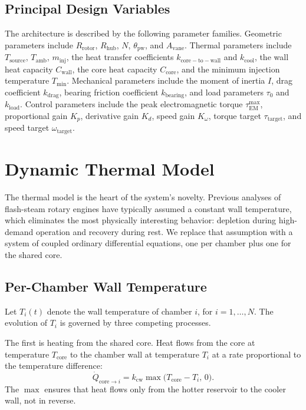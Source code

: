 \documentclass[11pt, a4paper]{article}
\theoremstyle{plain}
\theoremstyle{definition}
\newcommand{\Tcore}{T_{\mathrm{core}}}
\newcommand{\Tsource}{T_{\mathrm{source}}}
\newcommand{\Tambient}{T_{\mathrm{amb}}}
\newcommand{\tauEM}{\tau_{\mathrm{EM}}}
\newcommand{\om}{\omega}
\newcommand{\Nch}{N}
\begin{document}
\subsection{Principal Design Variables}

The architecture is described by the following parameter families. Geometric parameters include $R_{\mathrm{rotor}}$, $R_{\mathrm{hub}}$, $\Nch$, $\theta_{\mathrm{pw}}$, and $A_{\mathrm{vane}}$. Thermal parameters include $\Tsource$, $\Tambient$, $m_{\mathrm{inj}}$, the heat transfer coefficients $k_{\mathrm{core-to-wall}}$ and $k_{\mathrm{cool}}$, the wall heat capacity $C_{\mathrm{wall}}$, the core heat capacity $C_{\mathrm{core}}$, and the minimum injection temperature $T_{\mathrm{min}}$. Mechanical parameters include the moment of inertia $I$, drag coefficient $k_{\mathrm{drag}}$, bearing friction coefficient $k_{\mathrm{bearing}}$, and load parameters $\tau_0$ and $k_{\mathrm{load}}$. Control parameters include the peak electromagnetic torque $\tauEM^{\mathrm{max}}$, proportional gain $K_p$, derivative gain $K_d$, speed gain $K_\om$, torque target $\tau_{\mathrm{target}}$, and speed target $\om_{\mathrm{target}}$.

\section{Dynamic Thermal Model}
\label{sec:thermal}

The thermal model is the heart of the system's novelty. Previous analyses of flash-steam rotary engines have typically assumed a constant wall temperature, which eliminates the most physically interesting behavior: depletion during high-demand operation and recovery during rest. We replace that assumption with a system of coupled ordinary differential equations, one per chamber plus one for the shared core.

\subsection{Per-Chamber Wall Temperature}

Let $T_i(t)$ denote the wall temperature of chamber $i$, for $i = 1, \ldots, \Nch$. The evolution of $T_i$ is governed by three competing processes.

The first is heating from the shared core. Heat flows from the core at temperature $\Tcore$ to the chamber wall at temperature $T_i$ at a rate proportional to the temperature difference:
\begin{equation}
  \dot{Q}_{{\mathrm{core}\to i}} = k_{\mathrm{cw}} \max\!\bigl(\Tcore - T_i,\, 0\bigr).
\end{equation}
The $\max$ ensures that heat flows only from the hotter reservoir to the cooler wall, not in reverse.
\end{document}
